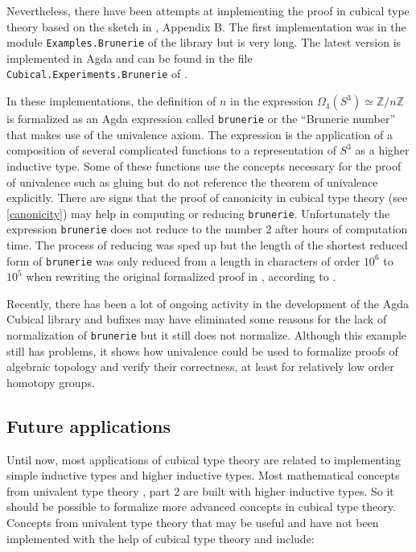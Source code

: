 \documentclass[12pt,a4paper,twoside,xetex]{book}
\begin{document}
Nevertheless, there have been attempts at implementing the proof in cubical type 
theory based on the sketch in \cite{Brunerie2016}, Appendix B. The first 
implementation was in the module \texttt{Examples.Brunerie} of the library 
\cite{Moertberg2015} but is very long. The latest version is implemented in Agda 
and can be found in the file  \texttt{Cubical.Experiments.Brunerie} of 
\cite{Moertberg2018}. 

In these implementations, the definition of  $n$ in the expression 
$\Omega_4(S^3) \simeq \mathbb{Z}/n\mathbb{Z}$ is formalized as an Agda 
expression called \texttt{brunerie} or the ``Brunerie number'' that makes use 
of the univalence axiom. The expression is the application of a composition of 
several complicated functions to a representation of $S^3$ as a higher 
inductive type. Some of these functions use the concepts necessary for the proof 
of univalence such as gluing but do not reference the theorem of 
univalence explicitly. There are signs that the proof of canonicity in 
cubical type theory (see \cref{canonicity}) may help in computing 
or reducing \texttt{brunerie}. Unfortunately the expression 
\texttt{brunerie} does not reduce to the number $2$ after hours of 
computation time. The process of reducing was sped up but the length of the
shortest reduced form of  \texttt{brunerie} was  only 
reduced from a length in characters of order $10^6$ to $10^5$ when rewriting 
the original formalized proof \cite{Moertberg2015} in \cite{Moertberg2018},  
according to \cite{Brunerie2018}.

Recently, there has been a lot of ongoing activity in the development of the 
Agda Cubical library and bufixes may have eliminated some reasons for the lack 
of normalization of \texttt{brunerie} but it still does not normalize. Although this example still has problems, 
it shows how univalence could be used to formalize proofs of algebraic topology 
and verify their correctness, at least for relatively low order homotopy groups.

\subsection{Future applications}\label{futapp}

Until now, most applications of cubical type theory are related to implementing 
simple inductive types and higher inductive types. Most mathematical concepts 
from univalent type theory \cite{Voevodsky2013}, part 2 are built with higher 
inductive types. So it should be possible to formalize more advanced concepts in 
cubical type theory. Concepts from univalent type theory that may be useful and 
have not been implemented with the help of cubical type theory and 
\cite{Moertberg2018} include:
\end{document}
